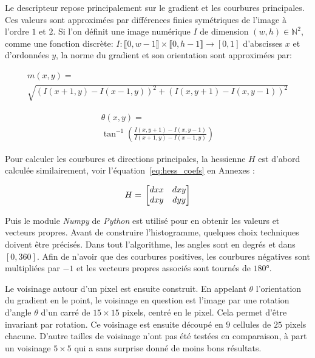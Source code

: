 \documentclass[
	a4paper, %
	10pt, %
	unnumberedsections, %
	twoside, %
]{LTJournalArticle}
\begin{document}
Le descripteur repose principalement sur le gradient et les courbures principales.
Ces valeurs sont approximées par différences finies symétriques de l'image à l'ordre $1$ et $2$.
Si l'on définit une image numérique $I$ de dimension $(w, h) \in \mathbb{N}^2$,
comme une fonction discrète:
$I: \llbracket 0, w-1 \rrbracket \times \llbracket 0, h-1 \rrbracket \rightarrow [0, 1]$
d'abscisses $x$ et d'ordonnées $y$, la norme du gradient
et son orientation sont approximées par:

\begin{multline} \label{eq:magnitude_grad}
	m(x, y) = \\
	\sqrt{(I(x+1, y) - I(x-1,y))^2 + (I(x,y+1)-I(x,y-1))^2}
\end{multline}

\begin{multline} \label{eq:angle_grad}
	\theta(x, y) = \\
	\tan^{-1}\left(\frac{I(x,y+1)-I(x,y-1)}{I(x+1, y) - I(x-1,y)}\right)
\end{multline}

Pour calculer les courbures et directions principales, la hessienne $H$ est d'abord calculée
similairement, voir l'équation~\ref{eq:hess_coefs} en Annexes :

\begin{equation}
	H = \\
	\begin{bmatrix}
		dxx & dxy \\
		dxy & dyy
	\end{bmatrix}
\end{equation}

Puis le module \textit{Numpy} de \textit{\textit{Python}} est utilisé pour en obtenir les valeurs et vecteurs
propres.
Avant de construire l'histogramme, quelques choix techniques doivent être précisés.
Dans tout l'algorithme, les angles sont en degrés et dans $[0, 360]$. Afin de n'avoir que des
courbures positives, les courbures négatives sont multipliées par $-1$
et les vecteurs propres associés sont tournés de $180$°.

Le voisinage autour d'un pixel est ensuite construit. En appelant $\theta$
l'orientation du gradient en le point, le voisinage en question est l'image par
une rotation d'angle $\theta$ d'un carré de $15\times 15$ pixels,
centré en le pixel. Cela permet d'être invariant par rotation.
Ce voisinage est ensuite découpé en $9$ cellules de $25$ pixels chacune.
D'autre tailles de voisinage n'ont pas été testées en comparaison, à
part un voisinage $5 \times 5$ qui a sans surprise donné de moins bons résultats.
\end{document}
